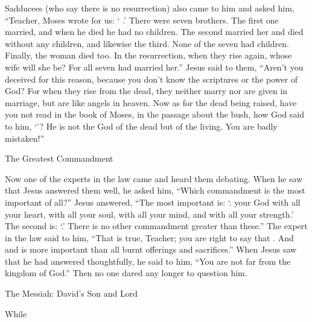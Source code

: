 {\par }{\PP {}Sadducees
(who
say
there is
no
resurrection) also
came
to
him
and
asked
him,
“Teacher,
Moses
wrote
for us: ‘{}
{}
{}
{}.’
There were
seven
brothers.
The first
one married,
and
when
he died
he had
no
children.
The second
married
her
and
died
without
any children,
and
likewise
the third.
None
of the seven
had
children.
Finally,
the woman
died too.
In
the resurrection,
when they rise again, whose
wife
will she be? For
all seven
had
married
her.”
Jesus
said
to them,
“Aren’t
you deceived
for
this reason,
because you don’t
know
the scriptures
or
the power
of God?
For
when
they rise
from
the dead,
they
neither
marry
nor
are given in marriage,
but
are
like
angels
in
heaven.
Now
as for
the dead
being raised,
have you
not
read
in
the book
of Moses,
in the passage about the bush,
how
God
said
to him, ‘{}’?
He is
not
the God
of
the dead
but
of
the living.
You are
badly
mistaken!”
\par }{\SH The Greatest Commandment
\par }{\PP {}Now
one
of the experts in the law
came
and heard
them
debating.
When
he saw
that
Jesus answered
them
well,
he asked
him,
“Which
commandment
is
the most important
of all?”
Jesus
answered,
“The most important
is: ‘{}.
{}
your
God
with
all
your
heart,
with
all
your
soul,
with
all
your
mind,
and
with
all
your
strength.’
The second
is: ‘{}.’ There is
no
other
commandment
greater than
these.”
The expert in the law
said
to him,
“That is true,
Teacher;
you are right
to
say
that
{}.
And
{}
and
{}
is
more important than
all
burnt offerings
and
sacrifices.”
When
Jesus
saw
that
he had answered
thoughtfully,
he said
to him,
“You are
not
far
from
the kingdom
of God.”
Then
no one
dared
any longer
to question
him.
\par }{\SH The Messiah: David’s Son and Lord
\par }{\PP {}While
}
